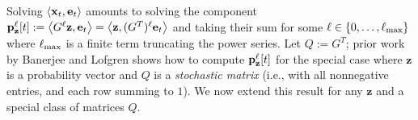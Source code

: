 Solving $\left< \mathbf{x}_t, \mathbf{e}_t \right>$ amounts to solving the component ${\mathbf{p}}_\mathbf{z}^{\ell}[t] := \left< G^{\ell}\mathbf{z}, \mathbf{e}_t \right> = \left< \mathbf{z}, (G^T)^{\ell}\mathbf{e}_t \right>$ and taking their sum for some $\ell \in \{0,\ldots,\ell_{\max}\}$ where $\ell_{\max}$ is a finite term truncating the power series. 
Let $Q:=G^T$; prior work by Banerjee and Lofgren \cite{banerjee2015fast} shows how to compute ${\mathbf{p}}_\mathbf{z}^{\ell}[t]$ for the special case where $\mathbf{z}$ is a probability vector and $Q$ is a \emph{stochastic matrix} (i.e., with all nonnegative entries, and each row summing to $1$). 
We now extend this result for any $\mathbf{z}$ and a special class of matrices $Q$.
